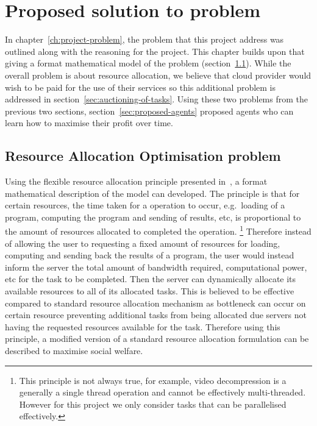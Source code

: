 \chapter{Proposed solution to problem}\label{ch:proposed-solution-to-problem}
In chapter~\ref{ch:project-problem}, the problem that this project address was outlined along with the reasoning for the
project. This chapter builds upon that giving a format mathematical model of the problem
(section~\ref{sec:optimisation-problem}). While the overall problem is about resource allocation, we believe that cloud
provider would wish to be paid for the use of their services so this additional problem is addressed in
section~\ref{sec:auctioning-of-tasks}. Using these two problems from the previous two sections,
section~\ref{sec:proposed-agents} proposed agents who can learn how to maximise their profit over time.

\section{Resource Allocation Optimisation problem}\label{sec:optimisation-problem}
Using the flexible resource allocation principle presented in~\cite{FlexibleResourceAllocation}, a format mathematical
description of the model can developed. The principle is that for certain resources, the time taken for a operation to occur,
e.g.\ loading of a program, computing the program and sending of results, etc, is proportional to the amount of
resources allocated to completed the operation. \footnote{This principle is not always true, for example, video
decompression is a generally a single thread operation and cannot be effectively multi-threaded. However for this
project we only consider tasks that can be parallelised effectively.}
Therefore instead of allowing the user to requesting a fixed amount of resources for loading, computing and sending back
the results of a program, the user would instead inform the server the total amount of bandwidth required,
computational power, etc for the task to be completed. Then the server can dynamically allocate its available resources
to all of its allocated tasks. This is believed to be effective compared to standard resource allocation mechanism as
bottleneck can occur on certain resource preventing additional tasks from being allocated due servers not
having the requested resources available for the task. Therefore using this principle, a modified version of a standard
resource allocation formulation can be described to maximise social welfare.

